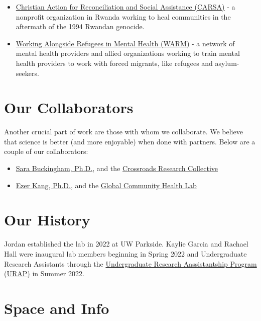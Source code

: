 \documentclass[
]{book}
\begin{document}
\begin{itemize}
\item
  \href{https://www.carsaministry.org/}{Christian Action for Reconciliation and Social Assistance (CARSA)} - a nonprofit organization in Rwanda working to heal communities in the aftermath of the 1994 Rwandan genocide.
\item
  \href{warmalska.org}{Working Alongside Refugees in Mental Health (WARM)} - a network of mental health providers and allied organizations working to train mental health providers to work with forced migrants, like refugees and asylum-seekers.
\end{itemize}

\hypertarget{our-collaborators}{%
\section{Our Collaborators}\label{our-collaborators}}

Another crucial part of work are those with whom we collaborate. We believe that science is better (and more enjoyable) when done with partners. Below are a couple of our collaborators:

\begin{itemize}
\item
  \href{https://www.uaa.alaska.edu/academics/college-of-arts-and-sciences/departments/psychology/faculty/buckingham.cshtml}{Sara Buckingham, Ph.D.}, and the \href{https://crossroadsresearch.wixsite.com/collective}{Crossroads Research Collective}
\item
  \href{https://profiles.howard.edu/profile/466/ezer-kang}{Ezer Kang, Ph.D.}, and the \href{https://ezerkang-howard-faculty.com/}{Global Community Health Lab}
\end{itemize}

\hypertarget{our-history}{%
\section{Our History}\label{our-history}}

Jordan established the lab in 2022 at UW Parkside. Kaylie Garcia and Rachael Hall were inaugural lab members beginning in Spring 2022 and Undergraduate Research Assistants through the \protect\hyperlink{URAP}{Undergraduate Research Aassistantship Program (URAP)} in Summer 2022.

\hypertarget{space-and-info}{%
\section{Space and Info}\label{space-and-info}}
\end{document}
